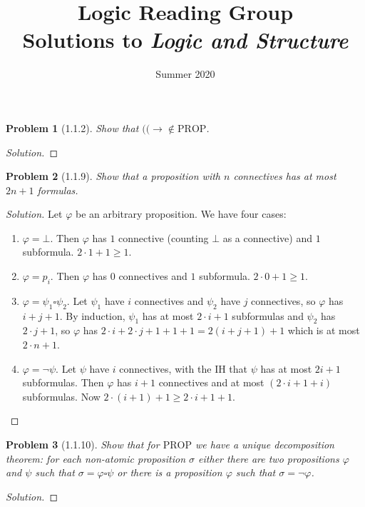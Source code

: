 \documentclass[letter]{article}
\title{Logic Reading Group\\Solutions to \textit{Logic and Structure}}
\date{Summer 2020}
\newtheorem{problem}{Problem}
\theoremstyle{definition}
\newenvironment{solution}
{\begin{proof}[Solution]}
        {\end{proof}}
\renewcommand{\phi}{\varphi}
\begin{document}
\maketitle

\newpage
\begin{problem}[1.1.2]
    Show that $(( \to \not \in \textrm{PROP}$.
\end{problem}
\begin{solution}
\end{solution}

\begin{problem}[1.1.9] Show that a proposition with $n$ connectives has at most $2n + 1$ formulas.
\end{problem}
\begin{solution}
    Let $\phi$ be an arbitrary proposition. We have four cases:
    \begin{enumerate}
        \item $\phi = \bot$. Then $\phi$ has $1$ connective (counting $\bot$ as a connective) and $1$ subformula. $2 \cdot 1 + 1 \geq 1$.
        \item $\phi = p_i$. Then $\phi$ has $0$ connectives and $1$ subformula. $2 \cdot 0 + 1 \geq 1$.
        \item $\phi = \psi_1 \square \psi_2$. Let $\psi_1$ have $i$ connectives and $\psi_2$ have $j$ connectives, so $\phi$ has $i + j + 1$. By induction, $\psi_1$ has at most $2 \cdot i + 1$ subformulas and $\psi_2$ has $2 \cdot j + 1$, so $\phi$ has $2 \cdot i + 2 \cdot j + 1 + 1 + 1 = 2 (i + j + 1) + 1$ which is at most $2 \cdot n + 1$.
        \item $\phi = \neg \psi$. Let $\psi$ have $i$ connectives, with the IH that $\psi$ has at most $2 i + 1$ subformulas. Then $\phi$ has $i + 1$ connectives and at most $(2 \cdot i + 1 + i)$ subformulas. Now $2 \cdot (i + 1) + 1 \geq 2 \cdot i + 1 + 1$.
    \end{enumerate}
\end{solution}

\begin{problem}[1.1.10] Show that for $\textrm{PROP}$ we have a unique decomposition theorem: for each non-atomic proposition $\sigma$ either there are two propositions $\phi$ and $\psi$ such that $\sigma = \phi \square \psi$ or there is a proposition $\phi$ such that $\sigma = \neg \phi$.
\end{problem}
\begin{solution}
\end{solution}
\end{document}
